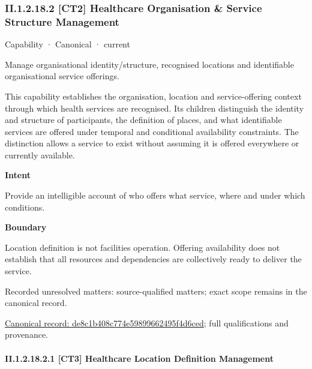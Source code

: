 \subsubsection*{II.1.2.18.2 [CT2] Healthcare Organisation \& Service Structure Management}
\label{navigation:II.1.2.18.2}

\label{element:de8c1b408c774e59899662495f4d6ced}
{\small Capability · Canonical · current}\par

Manage organisational identity/structure, recognised locations and identifiable organisational service offerings.



This capability establishes the organisation, location and service-offering context through which health services are recognised. Its children distinguish the identity and structure of participants, the definition of places, and what identifiable services are offered under temporal and conditional availability constraints. The distinction allows a service to exist without assuming it is offered everywhere or currently available.



\textbf{Intent}



Provide an intelligible account of who offers what service, where and under which conditions.



\textbf{Boundary}



Location definition is not facilities operation. Offering availability does not establish that all resources and dependencies are collectively ready to deliver the service.


{\small Recorded unresolved matters: source-qualified matters; exact scope remains in the canonical record.}\par
{\footnotesize \href{../../../../../../../continuum/strategy/capability/de8c1b408c774e59899662495f4d6ced.md}{Canonical record: de8c1b408c774e59899662495f4d6ced}; full qualifications and provenance.}\par
\paragraph*{II.1.2.18.2.1 [CT3] Healthcare Location Definition Management}
\label{navigation:II.1.2.18.2.1}

